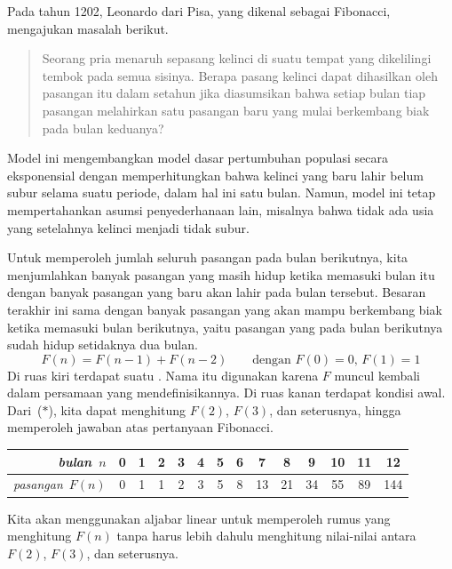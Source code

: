 
Pada tahun 1202, Leonardo dari Pisa, yang dikenal sebagai Fibonacci,
mengajukan masalah berikut.
\begin{quotation}
  \noindent Seorang pria menaruh sepasang kelinci di suatu tempat
  yang dikelilingi tembok pada semua sisinya.
  Berapa pasang kelinci dapat dihasilkan oleh pasangan itu dalam setahun
  jika diasumsikan bahwa setiap bulan tiap pasangan melahirkan satu pasangan
  baru yang mulai berkembang biak pada bulan keduanya?
\end{quotation}
Model ini mengembangkan model dasar pertumbuhan populasi secara eksponensial
dengan memperhitungkan bahwa kelinci yang baru lahir belum subur selama suatu
periode, dalam hal ini satu bulan.
Namun, model ini tetap mempertahankan asumsi penyederhanaan lain, misalnya
bahwa tidak ada usia yang setelahnya kelinci menjadi tidak subur.

Untuk memperoleh jumlah seluruh pasangan pada bulan berikutnya,
kita menjumlahkan banyak pasangan yang masih hidup ketika memasuki bulan itu
dengan banyak pasangan yang baru akan lahir pada bulan tersebut.
Besaran terakhir ini sama dengan banyak pasangan yang akan mampu
berkembang biak ketika memasuki bulan berikutnya, yaitu pasangan yang pada
bulan berikutnya sudah hidup setidaknya dua bulan.
\begin{equation*}
  F(n)=F(n-1)+F(n-2)  \qquad \text{dengan $F(0)=0$, $F(1)=1$}
  \tag{$*$}
\end{equation*}
Di ruas kiri terdapat suatu
.
Nama itu digunakan karena $F$ muncul kembali dalam persamaan yang
mendefinisikannya.
Di ruas kanan terdapat kondisi awal.
Dari~($*$), kita dapat menghitung $F(2)$, $F(3)$, dan seterusnya,
hingga memperoleh jawaban atas pertanyaan Fibonacci.
\begin{center}
  \begin{tabular}{r|ccccccccccccc}
    \textit{bulan}~$n$
     &0  &1  &2  &3  &4  &5  &6  &7  &8  &9  &10  &11  &12  \\ \hline
    \textit{pasangan}~$F(n)$
     &0  &1  &1  &2  &3  &5  &8  &13  &21  &34  &55  &89  &144   
  \end{tabular}
\end{center}
Kita akan menggunakan aljabar linear untuk memperoleh rumus yang menghitung
$F(n)$ tanpa harus lebih dahulu menghitung nilai-nilai antara $F(2)$, $F(3)$,
dan seterusnya.

